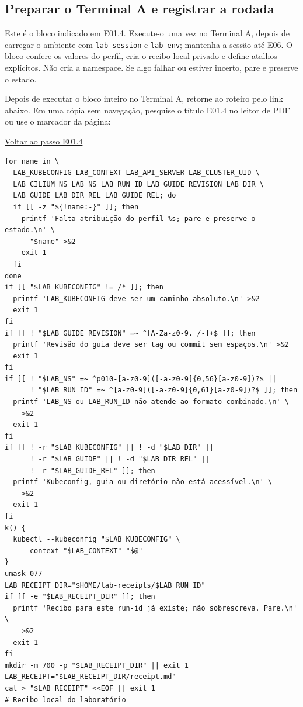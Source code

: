 \documentclass[12pt,openany,oneside,a4paper,chapter=TITLE,english,brazil]{abntex2}
\begin{document}
\begin{apendicesenv}

\chapter{Preparar o Terminal A e registrar a rodada}\label{preparar-o-terminal-a-e-registrar-a-rodada}

\hypertarget{p010-preparacao-terminal-a}{}

Este é o bloco indicado em E01.4. Execute-o uma vez no Terminal A, depois de carregar o ambiente com \texttt{lab-{}\allowbreak{}session} e \texttt{lab-{}\allowbreak{}env}; mantenha a sessão até E06. O bloco confere os valores do perfil, cria o recibo local privado e define atalhos explícitos. Não cria a namespace. Se algo falhar ou estiver incerto, pare e preserve o estado.

Depois de executar o bloco inteiro no Terminal A, retorne ao roteiro pelo link abaixo. Em uma cópia sem navegação, pesquise o título E01.4 no leitor de PDF ou use o marcador da página:

\hyperlink{p010-e01-4-preparacao}{Voltar ao passo E01.4}

\begin{verbatim}
for name in \
  LAB_KUBECONFIG LAB_CONTEXT LAB_API_SERVER LAB_CLUSTER_UID \
  LAB_CILIUM_NS LAB_NS LAB_RUN_ID LAB_GUIDE_REVISION LAB_DIR \
  LAB_GUIDE LAB_DIR_REL LAB_GUIDE_REL; do
  if [[ -z "${!name:-}" ]]; then
    printf 'Falta atribuição do perfil %s; pare e preserve o estado.\n' \
      "$name" >&2
    exit 1
  fi
done
if [[ "$LAB_KUBECONFIG" != /* ]]; then
  printf 'LAB_KUBECONFIG deve ser um caminho absoluto.\n' >&2
  exit 1
fi
if [[ ! "$LAB_GUIDE_REVISION" =~ ^[A-Za-z0-9._/-]+$ ]]; then
  printf 'Revisão do guia deve ser tag ou commit sem espaços.\n' >&2
  exit 1
fi
if [[ ! "$LAB_NS" =~ ^p010-[a-z0-9]([-a-z0-9]{0,56}[a-z0-9])?$ ||
      ! "$LAB_RUN_ID" =~ ^[a-z0-9]([-a-z0-9]{0,61}[a-z0-9])?$ ]]; then
  printf 'LAB_NS ou LAB_RUN_ID não atende ao formato combinado.\n' \
    >&2
  exit 1
fi
if [[ ! -r "$LAB_KUBECONFIG" || ! -d "$LAB_DIR" ||
      ! -r "$LAB_GUIDE" || ! -d "$LAB_DIR_REL" ||
      ! -r "$LAB_GUIDE_REL" ]]; then
  printf 'Kubeconfig, guia ou diretório não está acessível.\n' \
    >&2
  exit 1
fi
k() {
  kubectl --kubeconfig "$LAB_KUBECONFIG" \
    --context "$LAB_CONTEXT" "$@"
}
umask 077
LAB_RECEIPT_DIR="$HOME/lab-receipts/$LAB_RUN_ID"
if [[ -e "$LAB_RECEIPT_DIR" ]]; then
  printf 'Recibo para este run-id já existe; não sobrescreva. Pare.\n' \
    >&2
  exit 1
fi
mkdir -m 700 -p "$LAB_RECEIPT_DIR" || exit 1
LAB_RECEIPT="$LAB_RECEIPT_DIR/receipt.md"
cat > "$LAB_RECEIPT" <<EOF || exit 1
# Recibo local do laboratório


\end{verbatim}
\end{apendicesenv}
\end{document}
